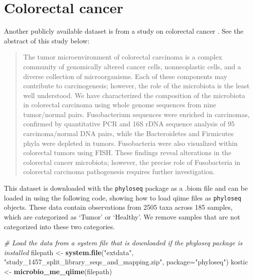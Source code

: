 \documentclass[
]{book}
\newenvironment{Shaded}{\begin{snugshade}}{\end{snugshade}}
\newcommand{\CommentTok}[1]{\textcolor[rgb]{0.56,0.35,0.01}{\textit{#1}}}
\newcommand{\DataTypeTok}[1]{\textcolor[rgb]{0.13,0.29,0.53}{#1}}
\newcommand{\KeywordTok}[1]{\textcolor[rgb]{0.13,0.29,0.53}{\textbf{#1}}}
\newcommand{\NormalTok}[1]{#1}
\newcommand{\StringTok}[1]{\textcolor[rgb]{0.31,0.60,0.02}{#1}}
\begin{document}
\hypertarget{colorectal-cancer}{%
\section{Colorectal cancer}\label{colorectal-cancer}}

Another publicly available dataset is from a study on colorectal cancer \citep{kostic2012}. See the abstract of this study below:

\begin{quote}
The tumor microenvironment of colorectal carcinoma is a complex community of genomically altered cancer cells, nonneoplastic cells, and a diverse collection of microorganisms. Each of these components may contribute to carcinogenesis; however, the role of the microbiota is the least well understood. We have characterized the composition of the microbiota in colorectal carcinoma using whole genome sequences from nine tumor/normal pairs. Fusobacterium sequences were enriched in carcinomas, confirmed by quantitative PCR and 16S rDNA sequence analysis of 95 carcinoma/normal DNA pairs, while the Bacteroidetes and Firmicutes phyla were depleted in tumors. Fusobacteria were also visualized within colorectal tumors using FISH. These findings reveal alterations in the colorectal cancer microbiota; however, the precise role of Fusobacteria in colorectal carcinoma pathogenesis requires further investigation.
\end{quote}

This dataset is downloaded with the \texttt{phyloseq} package as a .biom file and can be loaded in using the following code, showing how to load qiime files as \texttt{phyloseq} objects. These data contain observations from 2505 taxa across 185 samples, which are categorized as `Tumor' or `Healthy'. We remove samples that are not categorized into these two categories.

\begin{Shaded}
\begin{Highlighting}[]
\CommentTok{\# Load the data from a system file that is downloaded if the phyloseq package is installed}
\NormalTok{filepath \textless{}{-}}\StringTok{  }\KeywordTok{system.file}\NormalTok{(}\StringTok{"extdata"}\NormalTok{, }\StringTok{"study\_1457\_split\_library\_seqs\_and\_mapping.zip"}\NormalTok{, }\DataTypeTok{package=}\StringTok{"phyloseq"}\NormalTok{)}
\NormalTok{kostic \textless{}{-}}\StringTok{  }\KeywordTok{microbio\_me\_qiime}\NormalTok{(filepath)}
\end{Highlighting}
\end{Shaded}
\end{document}
